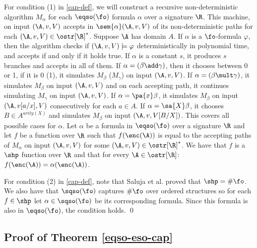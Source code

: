 For condition (1) in \ref{cap-def}, we will construct a recursive non-deterministic algorithm $M_{\alpha}$ for each $\eqso(\fo)$ formula $\alpha$ over a signature $\R$. This machine, on input $(\A,v,V)$ accepts in $\sem{\alpha}(\A,v,V)$ of its non-deterministic paths for each $(\A,v,V) \in \ostr[\R]^*$. Suppose $\A$ has domain $A$. If $\alpha$ is a $\fo$-formula $\varphi$, then the algorithm checks if $(\A,v,V)\models\varphi$ deterministically in polynomial time, and accepts if and only if it holds true. If $\alpha$ is a constant $s$, it produces $s$ branches and accepts in all of them. If $\alpha = (\beta \add \gamma)$, then it chooses between 0 or 1, if it is 0 (1), it simulates $M_{\beta}$ ($M_{\gamma}$) on input $(\A,v,V)$. If $\alpha = (\beta \mult \gamma)$, it simulates $M_{\beta}$ on input $(\A,v,V)$ and on each accepting path, it continues simulating $M_{\gamma}$ on input $(\A,v,V)$.%
If $\alpha = \pa{x}\beta$, it simulates $M_{\beta}$ on input $(\A,v[a/x],V)$ consecutively for each $a\in A$. If $\alpha = \sa{X}\beta$, it chooses $B\in A^{arity(X)}$ and simulates $M_{\beta}$ on input $(\A,v,V[B/X])$. This covers all possible cases for $\alpha$. Let $\alpha$ be a formula in $\eqso(\fo)$ over a signature $\R$ and let $f$ be a function over $\R$ such that $f(\enc(\A))$ is equal to the accepting paths of $M_{\alpha}$ on input $(\A,v,V)$ for some $(\A,v,V) \in \ostr[\R]^*$. We have that $f$ is a $\shp$ function over $\R$ and that for every $\A\in\ostr[\R]$: $f(\enc(\A)) = \alpha(\enc(\A))$.

For condition (2) in \ref{cap-def}, note that Saluja et al. \cite{SalujaST95} proved that $\shp = \#\fo$. We also have that $\sqso(\fo)$ captures $\#\fo$ over ordered structures so for each $f\in \shp$ let $\alpha \in \sqso(\fo)$ be its corresponding formula. Since this formula is also in $\eqso(\fo)$, the condition holds. \qed

\subsection*{Proof of Theorem \ref{eqso-eso-cap}}

